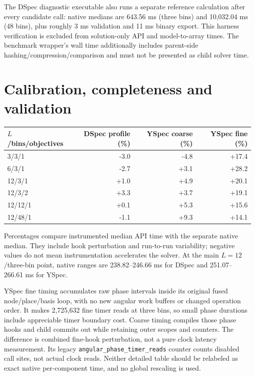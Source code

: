 The DSpec diagnostic executable also runs a separate reference calculation after every candidate call: native medians are 643.56 ms (three bins) and 10,032.04 ms (48 bins), plus roughly 3 ms validation and 11 ms binary export. This harness verification is excluded from solution-only API and model-to-array times. The benchmark wrapper's wall time additionally includes parent-side hashing/compression/comparison and must not be presented as child solver time.

\clearpage\section{Calibration, completeness and validation}
\begin{center}\small\begin{tabular}{lrrr}\toprule
$L$/bins/objectives & DSpec profile (\%) & YSpec coarse (\%) & YSpec fine (\%)\\\midrule
3/3/1 & -3.0 & -4.8 & +17.4\\
6/3/1 & -2.7 & +3.1 & +28.2\\
12/3/1 & +1.0 & +4.9 & +20.1\\
12/3/2 & +3.3 & +3.7 & +19.1\\
12/12/1 & +0.1 & +5.3 & +15.6\\
12/48/1 & -1.1 & +9.3 & +14.1\\
\bottomrule\end{tabular}\end{center}
Percentages compare instrumented median API time with the separate native median. They include hook perturbation and run-to-run variability; negative values do not mean instrumentation accelerates the solver. At the main $L=12$/three-bin point, native ranges are 238.82--246.66 ms for DSpec and 251.07--266.61 ms for YSpec.

YSpec fine timing accumulates raw phase intervals inside its original fused node/place/basis loop, with no new angular work buffers or changed operation order. It makes 2,725,632 fine timer reads at three bins, so small phase durations include appreciable timer boundary cost. Coarse timing compiles those phase hooks and child commits out while retaining outer scopes and counters. The difference is combined fine-hook perturbation, not a pure clock latency measurement. Its legacy \texttt{angular\_phase\_timer\_reads} counter counts disabled call sites, not actual clock reads. Neither detailed table should be relabeled as exact native per-component time, and no global rescaling is used.

